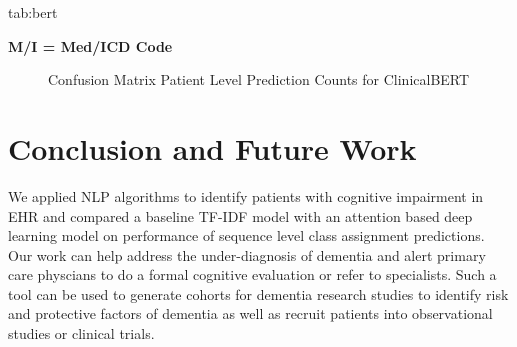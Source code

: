 \documentclass[pmlr,twocolumn,10pt]{jmlr} %
\begin{document}
\begin{table}[htb]
\floatconts
{tab:bert}
{\caption{Comparison between Other Indicators of Cognitive Impairment and ClinicalBERT}}
\centering
{}

\bfseries M/I = Med/ICD Code 
\end{table}


\begin{figure}[htb]
\caption{Confusion Matrix Patient Level Prediction Counts for ClinicalBERT}
\end{figure}

\section{Conclusion and Future Work} 
\label{sec:ConclusionFutureWork} We applied NLP algorithms to identify patients with cognitive impairment in EHR and compared a baseline TF-IDF model with an attention based deep learning model on performance of sequence level class assignment predictions. Our work can help address the under-diagnosis of dementia and alert primary care physcians to do a formal cognitive evaluation or refer to specialists. Such a tool can be used to generate cohorts for dementia research studies to identify risk and protective factors of dementia as well as recruit patients into observational studies or clinical trials. 
\end{document}
